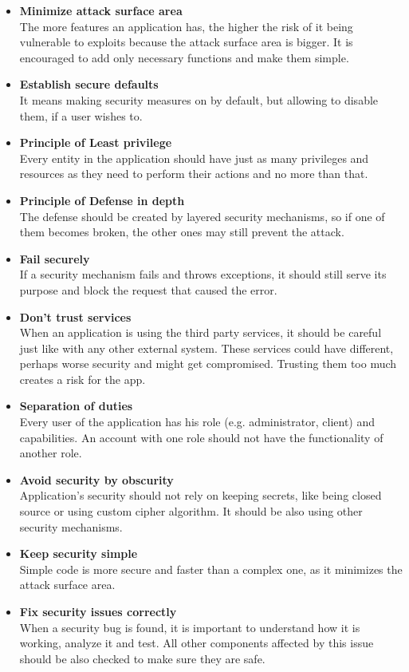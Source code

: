 \documentclass[a4paper]{article}
\begin{document}
\begin{itemize}
	\item \textbf{Minimize attack surface area} \\
		The more features an application has, the higher the risk of it
		being vulnerable to exploits because the attack surface area is
		bigger. It is encouraged to add only necessary functions and
		make them simple.
	\item \textbf{Establish secure defaults} \\
		It means making security measures on by default, but allowing to
		disable them, if a user wishes to.
	\item \textbf{Principle of Least privilege} \\
		Every entity in the application should have just as many
		privileges and resources as they need to perform their actions
		and no more than that.
	\item \textbf{Principle of Defense in depth} \\
		The defense should be created by layered security mechanisms, so
		if one of them becomes broken, the other ones may still prevent
		the attack.
	\item \textbf{Fail securely} \\
		If a security mechanism fails and throws exceptions, it should
		still serve its purpose and block the request that caused the
		error.
	\item \textbf{Don't trust services} \\
		When an application is using the third party services, it
		should be careful just like with any other external system.
		These services could have different, perhaps worse security and
		might get compromised. Trusting them too much creates a risk
		for the app.
	\item \textbf{Separation of duties} \\
		Every user of the application has his role (e.g. administrator,
		client) and capabilities. An account with one role should not
		have the functionality of another role.
	\item \textbf{Avoid security by obscurity} \\
		Application's security should not rely on keeping secrets, like
		being closed source or using custom cipher algorithm. It should
		be also using other security mechanisms.
	\item \textbf{Keep security simple} \\
		Simple code is more secure and faster than a complex one, as it
		minimizes the attack surface area.
	\item \textbf{Fix security issues correctly} \\
		When a security bug is found, it is important to understand how
		it is working, analyze it and test. All other components
		affected by this issue should be also checked to make sure they
		are safe.
\end{itemize}
\end{document}
